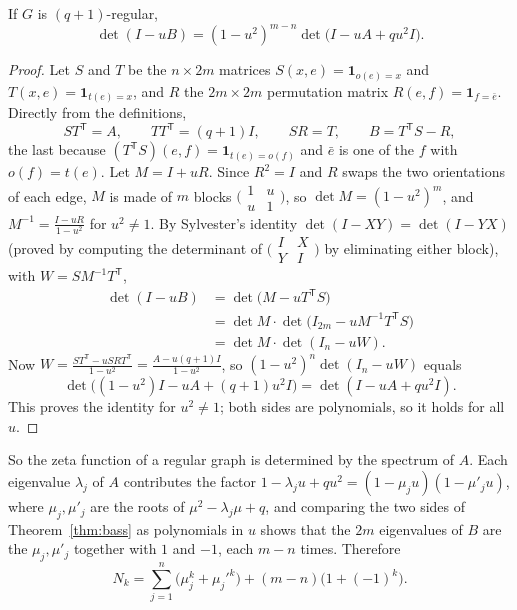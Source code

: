 \begin{theorem}\label{thm:bass}
If $G$ is $(q+1)$-regular,
\[
\det(I-uB)=(1-u^2)^{m-n}\det\bigl(I-uA+qu^2I\bigr).
\]
\end{theorem}

\begin{proof}
Let $S$ and $T$ be the $n\times2m$ matrices $S(x,e)=\mathbf 1_{o(e)=x}$ and $T(x,e)=\mathbf 1_{t(e)=x}$, and $R$ the $2m\times2m$ permutation matrix $R(e,f)=\mathbf 1_{f=\bar e}$. Directly from the definitions,
\[
ST^{\mathsf T}=A,\qquad TT^{\mathsf T}=(q+1)I,\qquad SR=T,\qquad B=T^{\mathsf T}S-R ,
\]
the last because $(T^{\mathsf T}S)(e,f)=\mathbf 1_{t(e)=o(f)}$ and $\bar e$ is one of the $f$ with $o(f)=t(e)$. Let $M=I+uR$. Since $R^2=I$ and $R$ swaps the two orientations of each edge, $M$ is made of $m$ blocks
$\bigl(\begin{smallmatrix}1&u\\u&1\end{smallmatrix}\bigr)$, so $\det M=(1-u^2)^m$, and $M^{-1}=\frac{I-uR}{1-u^2}$ for $u^2\ne1$. By Sylvester's identity $\det(I-XY)=\det(I-YX)$ (proved by computing the determinant of
$\bigl(\begin{smallmatrix}I&X\\Y&I\end{smallmatrix}\bigr)$ by eliminating either block),
with $W=SM^{-1}T^{\mathsf T}$,
\begin{align*}
\det(I-uB)&=\det\bigl(M-uT^{\mathsf T}S\bigr)\\
&=\det M\cdot\det\bigl(I_{2m}-uM^{-1}T^{\mathsf T}S\bigr)\\
&=\det M\cdot\det(I_n-uW).
\end{align*}
Now $W=\frac{ST^{\mathsf T}-uSRT^{\mathsf T}}{1-u^2}=\frac{A-u(q+1)I}{1-u^2}$, so $(1-u^2)^n\det(I_n-uW)$ equals
\[
\det\bigl((1-u^2)I-uA+(q+1)u^2I\bigr)=\det(I-uA+qu^2I).
\]
This proves the identity for $u^2\ne1$; both sides are polynomials, so it holds for all $u$.
\end{proof}

So the zeta function of a regular graph is determined by the spectrum of $A$. Each eigenvalue $\lambda_j$ of $A$ contributes the factor $1-\lambda_ju+qu^2=(1-\mu_ju)(1-\mu'_ju)$, where $\mu_j,\mu'_j$ are the roots of $\mu^2-\lambda_j\mu+q$, and
comparing the two sides of Theorem~\ref{thm:bass} as polynomials in $u$ shows that the $2m$ eigenvalues of $B$ are the $\mu_j,\mu'_j$ together with $1$ and $-1$, each $m-n$ times. Therefore
\begin{equation}\label{eq:nkspec}
N_k=\sum_{j=1}^n\bigl(\mu_j^k+\mu_j'^k\bigr)+(m-n)\bigl(1+(-1)^k\bigr).
\end{equation}

